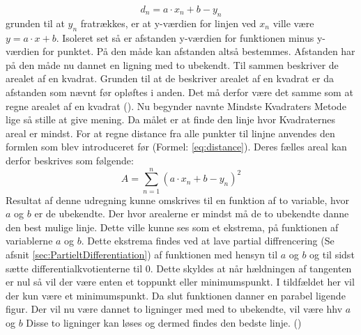 \begin{equation}\label{eq:distance}
    d_n = a \cdot x_n + b - y_n
\end{equation} grunden til at $y_n$ fratrækkes, er at y-værdien for linjen ved $x_n$ ville være $y = a \cdot x + b$. Isoleret set så er afstanden y-værdien for funktionen minus y-værdien for punktet. På den måde kan afstanden altså bestemmes. Afstanden har på den måde nu dannet en ligning med to ubekendt. Til sammen beskriver de arealet af en kvadrat. Grunden til at de beskriver arealet af en kvadrat er da afstanden som nævnt før opløftes i anden. Det må derfor være det samme som at regne arealet af en kvadrat (\cite{Bentzen2014}). Nu begynder navnte Mindste Kvadraters Metode lige så stille at give mening. Da målet er at finde den linje hvor Kvadraternes areal er mindst. For at regne distance fra alle punkter til linjne anvendes den formlen som blev introduceret før (Formel: \ref{eq:distance}). Deres fælles areal kan derfor beskrives som følgende:
\begin{equation}\label{eq:formularForDistanceForAllDataPoints}A = \sum_{n=1}^n (a \cdot x_n + b - y_n)^2\end{equation}
Resultat af denne udregning kunne omskrives til en funktion af to variable, hvor $a$ og $b$ er de ubekendte. Der hvor arealerne er mindst må de to ubekendte danne den best mulige linje. Dette ville kunne ses som et ekstrema, på funktionen af variablerne $a$ og $b$. Dette ekstrema findes ved at lave partial diffrencering (Se afsnit \ref{sec:PartieltDifferentiation}) af funktionen med hensyn til $a$ og $b$ og til sidst sætte differentialkvotienterne til 0. Dette skyldes at når hældningen af tangenten er nul så vil der være enten et toppunkt eller minimumspunkt. I tildfældet her vil der kun være et minimumspunkt. Da slut funktionen danner en parabel ligende figur. Der vil nu være dannet to ligninger med med to ubekendte, vil være hhv $a$ og $b$ Disse to ligninger kan løses og dermed findes den bedste linje. (\cite{webmatematikMindsteKvadratersMetode})

